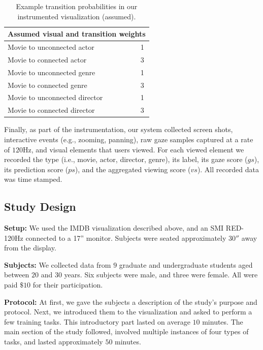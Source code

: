 \begin{table}[htbp]
	\centering
		\begin{tabular}{|l|c|}
			\hline
			 \multicolumn{2}{|c|}{Assumed visual and transition weights} \\ \hline
			Movie to unconnected actor & 1\\\hline
			Movie to connected actor & 3\\\hline
			Movie to unconnected genre & 1\\\hline
			Movie to connected genre & 3\\\hline
			Movie to unconnected director & 1\\\hline
			Movie to connected director & 3\\\hline
			\hline			
		\end{tabular}
	\caption{Example transition probabilities in our instrumented visualization (assumed).}
	\label{tab:Transition2}
\end{table}

Finally, as part of the instrumentation, our system collected screen shots, interactive events (e.g., zooming, panning), raw gaze samples captured at a rate of $120$Hz, and visual elements that users viewed. For each viewed element we recorded the type (i.e., movie, actor, director, genre), its label, its gaze score ($gs$), its prediction score ($ps$), and the aggregated viewing score ($vs$). All recorded data was time stamped.

\subsection{Study Design}
\label{sec:EvalStudyDesign}

\noindent\textbf{Setup: } We used the IMDB visualization described above, and an SMI RED-120Hz connected to a 17'' monitor. Subjects were seated approximately $30''$ away from the display. 

\noindent\textbf{Subjects:} We collected data from $9$ graduate and undergraduate students aged between $20$ and $30$ years. Six subjects were male, and three were female. All were paid $\$10$ for their participation. 

\noindent\textbf{Protocol:} At first, we gave the subjects a description of the study's purpose and protocol. Next, we introduced them to the visualization and asked to perform a few training tasks. This introductory part lasted on average $10$ minutes. The main section of the study followed, involved multiple instances of four types of tasks, and lasted approximately $50$ minutes. 


